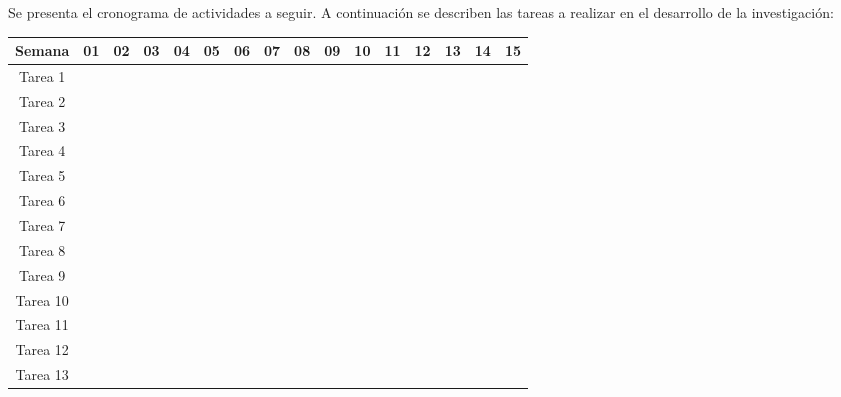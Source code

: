 
Se presenta el cronograma de actividades a seguir. A continuación se describen las tareas a realizar en el desarrollo de la investigación:
\begin{center}
\begingroup
\setlength{\tabcolsep}{7pt} %
\renewcommand{\arraystretch}{1.2} %
\begin{tabular}{|c|c|c|c|c|c|c|c|c|c|c|c|c|c|c|c|}
\hline
\textbf{Semana} & \textbf{01} & \textbf{02} & \textbf{03} & \textbf{04} & \textbf{05} & \textbf{06} & \textbf{07} & \textbf{08} & \textbf{09} & \textbf{10} & \textbf{11} & \textbf{12} & \textbf{13} & \textbf{14} & \textbf{15} \\ \hline
Tarea 1 & \cellcolor{gray}	&	&	&	&	&	&	&	&	&	&	&	&	&	& 	\\ \hline
Tarea 2 &	& \cellcolor{gray} & \cellcolor{gray} & \cellcolor{gray} &	&	&	&	&	&	&	&	&	&	&	\\ \hline
Tarea 3 &	&	&	& 	& \cellcolor{gray}	&	&	&	&	&	&	&	&	&	&	\\ \hline
Tarea 4 &	&	&	&	&	& \cellcolor{gray}	&	&	&	&	&	&	&	&	&	\\ \hline
Tarea 5 &	&	&	&	& \cellcolor{gray}	& \cellcolor{gray}	& \cellcolor{gray}	&	&	&	&	&	&	&	&	\\ \hline
Tarea 6 &	&	&	&	&	&	&	& \cellcolor{gray}	& 	&	&	&	&	&	&	\\ \hline
Tarea 7 &	&	&	&	&	&	&	&	& \cellcolor{gray}	& 	&	&	&	&	&	\\ \hline
Tarea 8 &	&	&	&	&	&	&	& \cellcolor{gray}	& \cellcolor{gray}	& \cellcolor{gray}	& 	&	&	&	&	\\ \hline
Tarea 9 & 	&	&	&	&	&	&	&	&	&	& \cellcolor{gray}	&  	&	&	& 	\\ \hline
Tarea 10 & 	&	&	&	&	&	&	&	&	&	&	& \cellcolor{gray}	&	&	& 	\\ \hline
Tarea 11 & 	&	&	&	&	&	&	&	&	&	&	& \cellcolor{gray}	& \cellcolor{gray}	&	& 	\\ \hline
Tarea 12 & 	&	&	&	&	&	&	&	&	&	&	&	& \cellcolor{gray}	& \cellcolor{gray}	& 	\\ \hline
Tarea 13 & 	&	&	&	&	&	&	&	&	& \cellcolor{gray}	& \cellcolor{gray}	& \cellcolor{gray}	& \cellcolor{gray}	& \cellcolor{gray}	& \cellcolor{gray} 	\\ \hline
\end{tabular}
\endgroup
\end{center}

